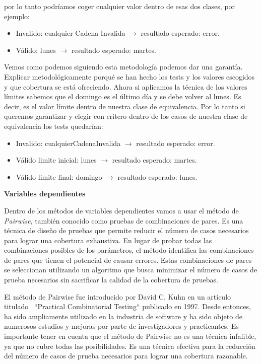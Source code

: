 por lo tanto podríamos coger cualquier valor dentro de esas dos clases, por ejemplo:

\begin{itemize}
    \item Invalido: cualquier Cadena Invalida \(\longrightarrow\) resultado esperado: error.
    \item Válido: lunes \(\longrightarrow\) resultado esperado: martes.
\end{itemize}

Vemos como podemos siguiendo esta metodología podemos dar una garantía.
Explicar metodológicamente porqué se han hecho los tests y los valores escogidos y que cobertura se está ofreciendo.
Ahora si aplicamos la técnica de los valores límites sabemos que el domingo es el último día y se debe volver al lunes.
Es decir, es el valor límite dentro de nuestra clase de equivalencia.
Por lo tanto si queremos garantizar y elegir con critero dentro de los casos de nuestra clase de equivalencia los tests quedarían:

\begin{itemize}
    \item Invalido: cualquierCadenaInvalida \(\longrightarrow\) resultado esperado: error.
    \item Válido limite inicial: lunes \(\longrightarrow\) resultado esperado: martes.
    \item Válido limite final: domingo \(\longrightarrow\) resultado esperado: lunes.
\end{itemize}

\textbf{Variables dependientes}\label{variablesDependendientes}

Dentro de los métodos de variables dependientes vamos a usar el método de \textit{Pairwise}, también conocido como pruebas de combinaciones de pares.
Es una técnica de diseño de pruebas que permite reducir el número de casos necesarios para lograr una cobertura exhaustiva.
En lugar de probar todas las combinaciones posibles de los parámetros, el método identifica las combinaciones de pares que tienen el potencial de causar errores.
Estas combinaciones de pares se seleccionan utilizando un algoritmo que busca minimizar el número de casos de prueba necesarios sin sacrificar la calidad de la cobertura de pruebas.

El método de Pairwise fue introducido por David C. Kuhn en un artículo titulado~\cite{37051} “Practical Combinatorial Testing“ publicado en 1997.
Desde entonces, ha sido ampliamente utilizado en la industria de software y ha sido objeto de numerosos estudios y mejoras por parte de investigadores y practicantes.
Es importante tener en cuenta que el método de Pairwise no es una técnica infalible, ya que no cubre todas las posibilidades.
Es una técnica efectiva para la reducción del número de casos de prueba necesarios para lograr una cobertura razonable.

